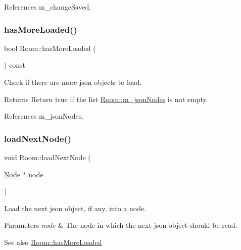 References m\+\_\+change\+Saved.

\mbox{\label{classRoom_abb662577c7ec3ea46d023a845e726cfa}} 
\subsubsection{\texorpdfstring{has\+More\+Loaded()}{hasMoreLoaded()}}
{\footnotesize\ttfamily bool Room\+::has\+More\+Loaded (\begin{DoxyParamCaption}{ }\end{DoxyParamCaption}) const}



Check if there are more json objects to load. 

\begin{DoxyReturn}{Returns}
Return true if the list \mbox{\hyperlink{classRoom_a98b8568422738036941daf95be83a9e3}{Room\+::m\+\_\+json\+Nodes}} is not empty. 
\end{DoxyReturn}


References m\+\_\+json\+Nodes.

\mbox{\label{classRoom_ab1f1a0f0b4db3483b0f09667d81f2d61}} 
\subsubsection{\texorpdfstring{load\+Next\+Node()}{loadNextNode()}}
{\footnotesize\ttfamily void Room\+::load\+Next\+Node (\begin{DoxyParamCaption}\item[{\mbox{\hyperlink{classNode}{Node}} $\ast$}]{node }\end{DoxyParamCaption})}



Load the next json object, if any, into a node. 


\begin{DoxyParams}{Parameters}
{\em node} & The node in which the next json object should be read. \\
\hline
\end{DoxyParams}
\begin{DoxySeeAlso}{See also}
\mbox{\hyperlink{classRoom_abb662577c7ec3ea46d023a845e726cfa}{Room\+::has\+More\+Loaded}} 
\end{DoxySeeAlso}


